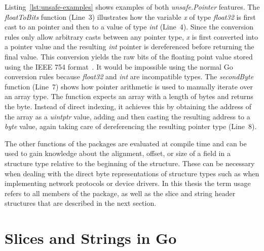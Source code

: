 Listing~\ref{lst:unsafe-examples} shows examples of both \textit{unsafe.Pointer} features.
The \textit{floatToBits} function (Line~3) illustrates how the variable \textit{x} of type \textit{float32} is first
cast to an \unsafe{} pointer and then to a value of type \textit{int} (Line~4).
Since the \unsafe{} conversion rules only allow arbitrary casts between any pointer type, \textit{x} is first converted
into a pointer value and the resulting \textit{int} pointer is dereferenced before returning the final value.
This conversion yields the raw bits of the floating point value stored using the IEEE 754 format~\cite{ieee754}.
It would be impossible using the normal Go conversion rules because \textit{float32} and \textit{int} are incompatible
types.
The \textit{secondByte} function (Line~7) shows how pointer arithmetic is used to manually iterate over an array type.
The function expects an array with a length of  bytes and returns the  byte.
Instead of direct indexing, it achieves this by obtaining the address of the array as a \textit{uintptr} value, adding
 and then casting the resulting address to a \textit{byte} value, again taking care of dereferencing the
resulting pointer type (Line~8).



The other functions of the \unsafe{} packages are evaluated at compile time and can be used to gain knowledge about
the alignment, offset, or size of a field in a structure type relative to the beginning of the structure.
These can be necessary when dealing with the direct byte representations of structure types such as when implementing
network protocols or device drivers.
In this thesis the term \unsafe{} usage refers to all members of the \unsafe{} package, as well as the slice and string
header structures that are described in the next section.



\section{Slices and Strings in Go}\label{sec:background:slices}

